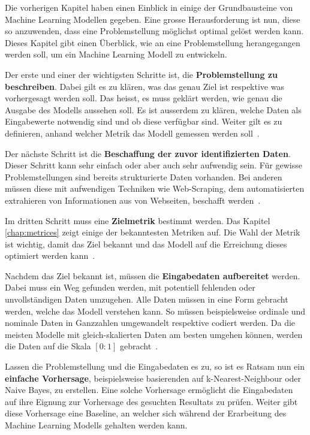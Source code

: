 Die vorherigen Kapitel haben einen Einblick in einige der Grundbausteine von Machine Learning Modellen gegeben. Eine grosse Herausforderung ist nun, diese so anzuwenden, dass eine Problemstellung möglichst optimal gelöst werden kann. Dieses Kapitel gibt einen Überblick, wie an eine Problemstellung herangegangen werden soll, um ein Machine Learning Modell zu entwickeln.

Der erste und einer der wichtigsten Schritte ist, die \textbf{Problemstellung zu beschreiben}. Dabei gilt es zu klären, was das genau Ziel ist respektive was vorhergesagt werden soll. Das heisst, es muss geklärt werden, wie genau die Ausgabe des Modells aussehen soll. Es ist ausserdem zu klären, welche Daten als Eingabewerte notwendig sind und ob diese verfügbar sind. Weiter gilt es zu definieren, anhand welcher Metrik das Modell gemessen werden soll~\autocite{DesignML}.

Der nächste Schritt ist die \textbf{Beschaffung der zuvor identifizierten Daten}. Dieser Schritt kann sehr einfach oder aber auch sehr aufwendig sein. Für gewisse Problemstellungen sind bereits strukturierte Daten vorhanden. Bei anderen müssen diese mit aufwendigen Techniken wie Web-Scraping, dem automatisierten extrahieren von Informationen aus von Webseiten, beschafft werden~\autocite{DesignML}.

Im dritten Schritt muss eine \textbf{Zielmetrik} bestimmt werden. Das Kapitel \ref{chap:metrices} zeigt einige der bekanntesten Metriken auf. Die Wahl der Metrik ist wichtig, damit das Ziel bekannt und das Modell auf die Erreichung dieses optimiert werden kann~\autocite{DesignML}.

Nachdem das Ziel bekannt ist, müssen die \textbf{Eingabedaten aufbereitet} werden. Dabei muss ein Weg gefunden werden, mit potentiell fehlenden oder unvollständigen Daten umzugehen. Alle Daten müssen in eine Form gebracht werden, welche das Modell verstehen kann. So müssen beispielsweise ordinale und nominale Daten in Ganzzahlen umgewandelt respektive codiert werden. Da die meisten Modelle mit gleich-skalierten Daten am besten umgehen können, werden die Daten auf die Skala $[0:1]$ gebracht~\autocite{DesignML}.

Lassen die Problemstellung und die Eingabedaten es zu, so ist es Ratsam nun ein \textbf{einfache Vorhersage}, beispielsweise basierenden auf k-Nearest-Neighbour oder Naive Bayes, zu erstellen. Eine solche Vorhersage ermöglicht die Eingabedaten auf ihre Eignung zur Vorhersage des gesuchten Resultats zu prüfen. Weiter gibt diese Vorhersage eine Baseline, an welcher sich während der Erarbeitung des Machine Learning Modells gehalten werden kann.~\autocite{DesignMLSecondaryCite}

